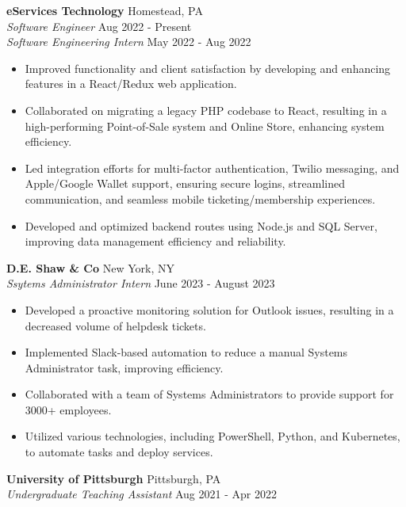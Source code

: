 \documentclass[letterpaper]{article}
\begin{document}
\textbf{eServices Technology} \hfill Homestead, PA\\
\textit{Software Engineer} \hfill Aug 2022 - Present\\
\textit{Software Engineering Intern} \hfill May 2022 - Aug 2022\\
\vspace{-1mm}
\begin{itemize} \itemsep -1pt
	\item Improved functionality and client satisfaction by developing and enhancing features in a React/Redux web application.
    \item Collaborated on migrating a legacy PHP codebase to React, resulting in a high-performing Point-of-Sale system and Online Store, enhancing system efficiency.
    \item Led integration efforts for multi-factor authentication, Twilio messaging, and Apple/Google Wallet support, ensuring secure logins, streamlined communication, and seamless mobile ticketing/membership experiences.
    \item Developed and optimized backend routes using Node.js and SQL Server, improving data management efficiency and reliability.
\end{itemize}
\vspace{-1mm}
\textbf{D.E. Shaw \& Co} \hfill New York, NY\\
\textit{Ssytems Administrator Intern} \hfill June 2023 - August 2023\\
\vspace{-1mm}
\begin{itemize} \itemsep -1pt
	\item Developed a proactive monitoring solution for Outlook issues, resulting in a decreased volume of helpdesk tickets.
	\item Implemented Slack-based automation to reduce a manual Systems Administrator task, improving efficiency.
	\item Collaborated with a team of Systems Administrators to provide support for 3000+ employees.
	\item Utilized various technologies, including PowerShell, Python, and Kubernetes, to automate tasks and deploy services.
\end{itemize}
\vspace{-1mm}
\textbf{University of Pittsburgh} \hfill Pittsburgh, PA\\
\textit{Undergraduate Teaching Assistant} \hfill Aug 2021 - Apr 2022\\
\vspace{-1mm}
\end{document}
